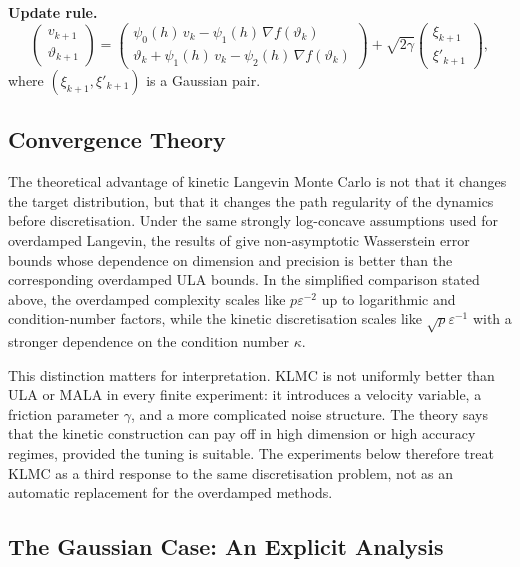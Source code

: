 \documentclass[a4paper,11pt, titlepage]{article}
\theoremstyle{definition}
\theoremstyle{plain}
\theoremstyle{remark}
\begin{document}
\textbf{Update rule.}
\begin{equation}
\begin{pmatrix} v_{k+1} \\ \vartheta_{k+1} \end{pmatrix}
=
\begin{pmatrix}
\psi_0(h)\, v_k - \psi_1(h)\, \nabla f(\vartheta_k) \\
\vartheta_k + \psi_1(h)\, v_k - \psi_2(h)\, \nabla f(\vartheta_k)
\end{pmatrix}
+
\sqrt{2\gamma}
\begin{pmatrix} \xi_{k+1} \\ \xi'_{k+1} \end{pmatrix},
\label{eq:klmc-update}
\end{equation}
where $(\xi_{k+1}, \xi'_{k+1})$ is a Gaussian pair.

\subsection{Convergence Theory}
\label{sec:ext-theory}

The theoretical advantage of kinetic Langevin Monte Carlo is not that it
changes the target distribution, but that it changes the path regularity
of the dynamics before discretisation. Under the same strongly
log-concave assumptions used for overdamped Langevin, the results of
\citet{DalalyanRiouDurand2020} give non-asymptotic Wasserstein error
bounds whose dependence on dimension and precision is better than the
corresponding overdamped ULA bounds. In the simplified comparison stated
above, the overdamped complexity scales like $p\varepsilon^{-2}$ up to
logarithmic and condition-number factors, while the kinetic discretisation
scales like $\sqrt{p}\varepsilon^{-1}$ with a stronger dependence on the
condition number $\kappa$.

This distinction matters for interpretation. KLMC is not uniformly better
than ULA or MALA in every finite experiment: it introduces a velocity
variable, a friction parameter $\gamma$, and a more complicated noise
structure. The theory says that the kinetic construction can pay off in
high dimension or high accuracy regimes, provided the tuning is suitable.
The experiments below therefore treat KLMC as a third response to the
same discretisation problem, not as an automatic replacement for the
overdamped methods.

\subsection{The Gaussian Case: An Explicit Analysis}
\label{sec:ext-gaussian}
\end{document}
